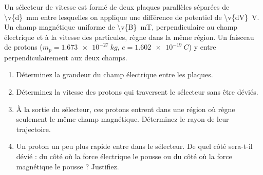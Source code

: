 Un sélecteur de vitesse est formé de deux plaques parallèles séparées de \qty{\v{d}}{mm} entre lesquelles on applique une différence de potentiel de \qty{\v{dV}}{V}. Un champ magnétique uniforme de \qty{\v{B}}{mT}, perpendiculaire au champ électrique et à la vitesse des particules, règne dans la même région. Un faisceau de protons ($m_p = \qty{1.673e-27}{kg}$, $e = \qty{1.602e-19}{C}$) y entre perpendiculairement aux deux champs.

\begin{center}
\end{center}

\begin{enumerate}[label=\alph*)]
    \item Déterminez la grandeur du champ électrique entre les plaques.
    \item Déterminez la vitesse des protons qui traversent le sélecteur sans être déviés.
    \item À la sortie du sélecteur, ces protons entrent dans une région où règne seulement le même champ magnétique. Déterminez le rayon de leur trajectoire.
    \item Un proton un peu plus rapide entre dans le sélecteur. De quel côté sera-t-il dévié : du côté où la force électrique le pousse ou du côté où la force magnétique le pousse ? Justifiez.
\end{enumerate}
